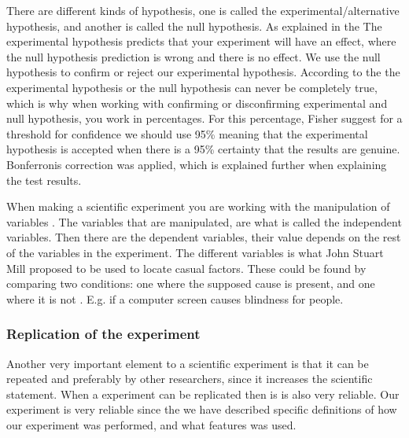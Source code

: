 There are different kinds of hypothesis, one is called the experimental/alternative hypothesis, and another is called the null hypothesis. As explained in the \citep[page 141]{Design} The experimental hypothesis predicts that your experiment will have an effect, where the null hypothesis prediction is wrong and there is no effect.
We use the null hypothesis to confirm or reject our experimental hypothesis. According to the \citep{Design} the experimental hypothesis or the null hypothesis can never be completely true, which is why when working with confirming or disconfirming experimental and null hypothesis, you work in percentages. For this percentage, Fisher suggest for a threshold for confidence we should use 95\% meaning that the experimental hypothesis is accepted when there is a 95\% certainty that the results are genuine. Bonferronis correction was applied, which is explained further when explaining the test results. 

When making a scientific experiment you are working with the manipulation of variables \citep[page 21]{Design}. The variables that are manipulated, are what is called the independent variables. Then there are the dependent variables, their value depends on the rest of the variables in the experiment\citep[page 21]{Design}. The different variables is what John Stuart Mill proposed to be used to locate casual factors. These could be found by comparing two conditions: one where the supposed cause is present, and one where it is not \citep[page 20]{Design}. E.g. if a computer screen causes blindness for people.

\subsubsection{Replication of the experiment}
Another very important element to a scientific experiment is that it can be repeated and preferably by other researchers, since it increases the scientific statement\citep[page 26]{Design}. When a experiment can be replicated then is is also very reliable. 
Our experiment is very reliable since the we have described specific definitions of how our experiment was performed, and what features was used.